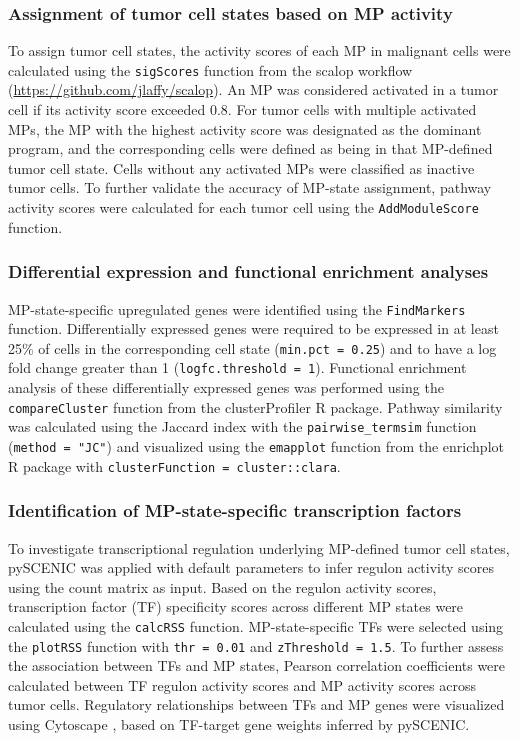 \documentclass[pdflatex,sn-mathphys-num]{sn-jnl}%
\theoremstyle{thmstyleone}%
\theoremstyle{thmstyletwo}%
\theoremstyle{thmstylethree}%
\begin{document}
\subsubsection{Assignment of tumor cell states based on MP activity}

To assign tumor cell states, the activity scores of each MP in malignant cells were calculated using the \texttt{sigScores} function from the scalop workflow (\url{https://github.com/jlaffy/scalop}). An MP was considered activated in a tumor cell if its activity score exceeded 0.8. For tumor cells with multiple activated MPs, the MP with the highest activity score was designated as the dominant program, and the corresponding cells were defined as being in that MP-defined tumor cell state. Cells without any activated MPs were classified as inactive tumor cells. To further validate the accuracy of MP-state assignment, pathway activity scores were calculated for each tumor cell using the \texttt{AddModuleScore} function.

\subsubsection{Differential expression and functional enrichment analyses}

MP-state-specific upregulated genes were identified using the \texttt{FindMarkers} function. Differentially expressed genes were required to be expressed in at least 25\% of cells in the corresponding cell state (\texttt{min.pct = 0.25}) and to have a log fold change greater than 1 (\texttt{logfc.threshold = 1}). Functional enrichment analysis of these differentially expressed genes was performed using the \texttt{compareCluster} function from the clusterProfiler R package. Pathway similarity was calculated using the Jaccard index with the \texttt{pairwise\_termsim} function (\texttt{method = "JC"}) and visualized using the \texttt{emapplot} function from the enrichplot R package with \texttt{clusterFunction = cluster::clara}.

\subsubsection{Identification of MP-state-specific transcription factors}

To investigate transcriptional regulation underlying MP-defined tumor cell states, pySCENIC \cite{bib35} was applied with default parameters to infer regulon activity scores using the count matrix as input. Based on the regulon activity scores, transcription factor (TF) specificity scores across different MP states were calculated using the \texttt{calcRSS} function. MP-state-specific TFs were selected using the \texttt{plotRSS} function with \texttt{thr = 0.01} and \texttt{zThreshold = 1.5}. To further assess the association between TFs and MP states, Pearson correlation coefficients were calculated between TF regulon activity scores and MP activity scores across tumor cells. Regulatory relationships between TFs and MP genes were visualized using Cytoscape \cite{bib36}, based on TF-target gene weights inferred by pySCENIC.
\end{document}
